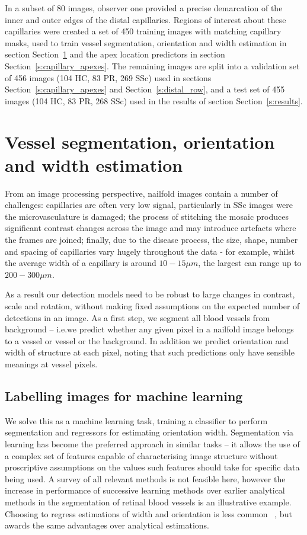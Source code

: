 \documentclass[runningheads,a4paper]{llncs}
\newcommand{\sref}[1]{Section~\ref{#1}}
\def\ie{i.e.}
\begin{document}
In a subset of 80 images, observer one provided a precise demarcation of the inner and outer edges of the distal capillaries. Regions of interest about these capillaries were created a set of 450 training images with matching capillary masks, used to train vessel segmentation, orientation and width estimation in section \sref{s:segmenting_vessels} and the apex location predictors in section \sref{s:capillary_apexes}. The remaining images are split into a validation set of 456 images (104 HC, 83 PR, 269 SSc) used in sections \sref{s:capillary_apexes} and \sref{s:distal_row}, and a test set of 455 images (104 HC, 83 PR, 268 SSc) used in the results of section \sref{s:results}.

%
\section{Vessel segmentation, orientation and width estimation}
\label{s:segmenting_vessels}
From an image processing perspective, nailfold images contain a number of challenges: capillaries are often very low signal, particularly in SSc images were the microvasculature is damaged; the process of stitching the mosaic produces significant contrast changes across the image and may introduce artefacts where the frames are joined; finally,  due to the disease process, the size, shape, number and spacing of capillaries vary hugely throughout the data - for example, whilst the average width of a capillary is around $10-15 \mu m$, the largest can range up to $200-300 \mu m$.

As a result our detection models need to be robust to large changes in contrast, scale and rotation, without making fixed assumptions on the expected number of detections in an image. As a first step, we segment all blood vessels from background -- \ie we predict whether any given pixel in a nailfold image belongs to a vessel or vessel or the background. In addition we predict orientation and width of structure at each pixel, noting that such predictions only have sensible meanings at vessel pixels.

\subsection{Labelling images for machine learning}
We solve this as a machine learning task, training a classifier to perform segmentation and regressors for estimating orientation width. Segmentation via learning has become the preferred approach in similar tasks -- it allows the use of a complex set of features capable of characterising image structure without proscriptive assumptions on the values such features should take for specific data being used. A survey of all relevant methods is not feasible here, however the increase in performance of successive learning methods \cite{} over earlier analytical methods \cite{}in the segmentation of retinal blood vessels is an illustrative example. Choosing to regress estimations of width and orientation is less common ~\cite{Berks_etal_IPMI11}, but awards the same advantages over analytical estimations.
\end{document}

